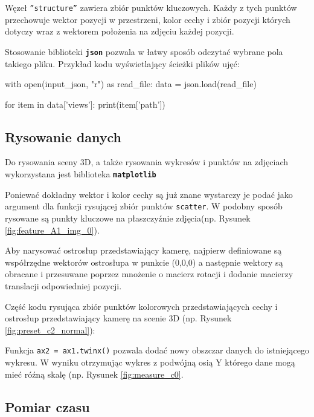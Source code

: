 Węzeł \texttt{”structure”} zawiera zbiór punktów kluczowych. Każdy z tych punktów przechowuje wektor pozycji w przestrzeni, kolor cechy i zbiór pozycji których dotyczy wraz z wektorem położenia na zdjęciu każdej pozycji.

Stosowanie biblioteki \textbf{\texttt{json}} pozwala w łatwy sposób odczytać wybrane pola takiego pliku.
Przykład kodu wyświetlający ścieżki plików ujęć:

\begin{python}
with open(input_json, "r") as read_file:
   data = json.load(read_file)

   for item in data['views']:
      print(item['path'])
\end{python}

\subsection{Rysowanie danych}

Do rysowania sceny 3D, a także rysowania wykresów i punktów na zdjęciach wykorzystana jest biblioteka \textbf{\texttt{matplotlib}}

Poniewać dokładny wektor i kolor cechy są już znane wystarczy je podać jako argument dla funkcji rysującej zbiór punktów \texttt{scatter}.
W podobny sposób rysowane są punkty kluczowe na płaszczyźnie zdjęcia(np. Rysunek \ref{fig:feature_A1_img_0}).

Aby narysować ostrosłup przedstawiający kamerę, najpierw definiowane są współrzędne wektorów ostrosłupa w punkcie (0,0,0) a następnie wektory są obracane i przesuwane poprzez mnożenie o macierz rotacji i dodanie macierzy translacji odpowiedniej pozycji.

Część kodu rysująca zbiór punktów kolorowych przedstawiających cechy i  ostrosłup przedstawiający kamerę na scenie 3D (np. Rysunek \ref{fig:preset_c2_normal}):


Funkcja \texttt{ax2 = ax1.twinx()} pozwala dodać nowy obszczar danych do istniejącego wykresu. W wyniku otrzymując wykres z podwójną osią Y którego dane mogą mieć róźną skalę (np. Rysunek \ref{fig:measure_c0}.

\subsection{Pomiar czasu}
